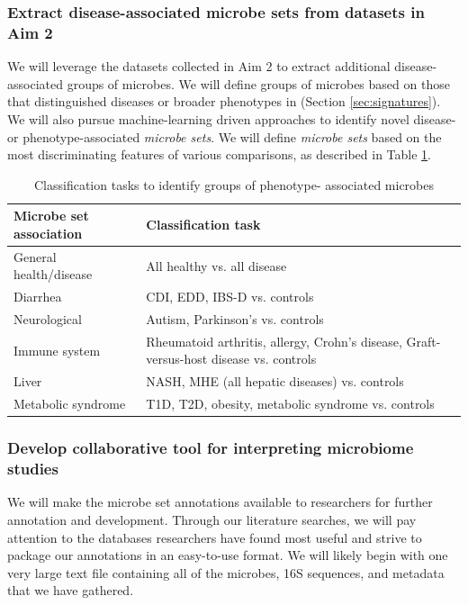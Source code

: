 \documentclass[12pt]{article}
\begin{document}
\subsubsection{Extract disease-associated microbe sets from datasets in Aim 2}
We will leverage the datasets collected in Aim 2 to extract additional 
disease-associated groups of microbes. We will define groups of 
microbes based on those that distinguished diseases or broader 
phenotypes in (Section \ref{sec:signatures}). We will also pursue 
machine-learning driven approaches to identify novel disease- or 
phenotype-associated \textit{microbe sets}. We will define 
\textit{microbe sets} based on the most discriminating features of 
various comparisons, as described in Table \ref{tab:classifications}.

\begin{table}
\begin{center}
\begin{tabular}{|p{6cm}|p{10cm}|}
	\hline
	\textbf{Microbe set association} & \textbf{Classification task} \\
	\hline
	General health/disease & All healthy vs. all disease \\
	\hline
	Diarrhea & CDI, EDD, IBS-D vs. controls \\
	\hline
	Neurological & Autism, Parkinson's vs. controls \\
	\hline
	Immune system & Rheumatoid arthritis, allergy, Crohn's disease, 
	Graft-versus-host disease vs. controls \\
	\hline
	Liver & NASH, MHE (all hepatic diseases) vs. controls\\
	\hline
	Metabolic syndrome & T1D, T2D, obesity, metabolic syndrome vs. 
	controls \\
	\hline
\end{tabular}
\caption{Classification tasks to identify groups of phenotype-
associated microbes}\label{tab:classifications}
\end{center}
\end{table}

\subsubsection{Develop collaborative tool for interpreting microbiome studies}
We will make the microbe set annotations available to researchers for 
further annotation and development. Through our literature searches, 
we will pay attention to the databases researchers have found most 
useful and strive to package our annotations in an easy-to-use format. 
We will likely begin with one very large text file containing all of 
the microbes, 16S sequences, and metadata that we have gathered. 
\end{document}
